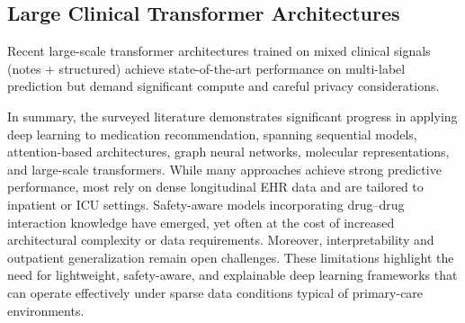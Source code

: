 \documentclass[conference,onecolumn]{IEEEtran}
\begin{document}
\subsection{Large Clinical Transformer Architectures}
Recent large-scale transformer architectures trained on mixed clinical signals (notes + structured) achieve state-of-the-art performance on multi-label prediction but demand significant compute and careful privacy considerations.


In summary, the surveyed literature demonstrates significant progress in applying deep learning to medication recommendation, spanning sequential models, attention-based architectures, graph neural networks, molecular representations, and large-scale transformers. While many approaches achieve strong predictive performance, most rely on dense longitudinal EHR data and are tailored to inpatient or ICU settings. Safety-aware models incorporating drug--drug interaction knowledge have emerged, yet often at the cost of increased architectural complexity or data requirements. Moreover, interpretability and outpatient generalization remain open challenges. These limitations highlight the need for lightweight, safety-aware, and explainable deep learning frameworks that can operate effectively under sparse data conditions typical of primary-care environments.
\end{document}
